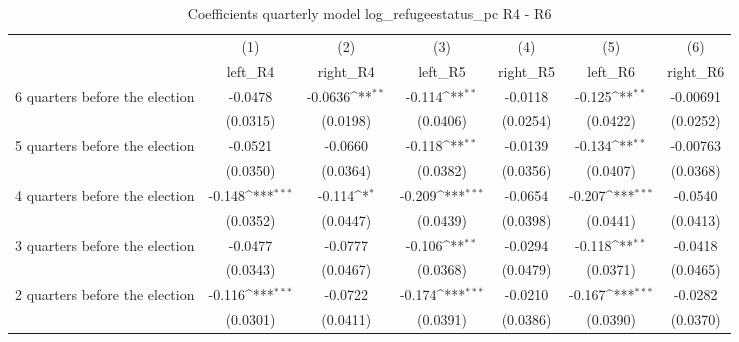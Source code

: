 \begin{table}[htbp]\centering
\def\sym#1{\ifmmode^{#1}\else\(^{#1}\)\fi}
\caption{Coefficients quarterly model log\_refugeestatus\_pc R4 - R6}
\begin{tabular}{l*{6}{c}}
\hline\hline
                    &\multicolumn{1}{c}{(1)}&\multicolumn{1}{c}{(2)}&\multicolumn{1}{c}{(3)}&\multicolumn{1}{c}{(4)}&\multicolumn{1}{c}{(5)}&\multicolumn{1}{c}{(6)}\\
                    &\multicolumn{1}{c}{left\_R4}&\multicolumn{1}{c}{right\_R4}&\multicolumn{1}{c}{left\_R5}&\multicolumn{1}{c}{right\_R5}&\multicolumn{1}{c}{left\_R6}&\multicolumn{1}{c}{right\_R6}\\
\hline
 6 quarters before the election&     -0.0478         &     -0.0636\sym{**} &      -0.114\sym{**} &     -0.0118         &      -0.125\sym{**} &    -0.00691         \\
                    &    (0.0315)         &    (0.0198)         &    (0.0406)         &    (0.0254)         &    (0.0422)         &    (0.0252)         \\
[1em]
 5 quarters before the election&     -0.0521         &     -0.0660         &      -0.118\sym{**} &     -0.0139         &      -0.134\sym{**} &    -0.00763         \\
                    &    (0.0350)         &    (0.0364)         &    (0.0382)         &    (0.0356)         &    (0.0407)         &    (0.0368)         \\
[1em]
 4 quarters before the election&      -0.148\sym{***}&      -0.114\sym{*}  &      -0.209\sym{***}&     -0.0654         &      -0.207\sym{***}&     -0.0540         \\
                    &    (0.0352)         &    (0.0447)         &    (0.0439)         &    (0.0398)         &    (0.0441)         &    (0.0413)         \\
[1em]
 3 quarters before the election&     -0.0477         &     -0.0777         &      -0.106\sym{**} &     -0.0294         &      -0.118\sym{**} &     -0.0418         \\
                    &    (0.0343)         &    (0.0467)         &    (0.0368)         &    (0.0479)         &    (0.0371)         &    (0.0465)         \\
[1em]
 2 quarters before the election&      -0.116\sym{***}&     -0.0722         &      -0.174\sym{***}&     -0.0210         &      -0.167\sym{***}&     -0.0282         \\
                    &    (0.0301)         &    (0.0411)         &    (0.0391)         &    (0.0386)         &    (0.0390)         &    (0.0370)         \\

\end{tabular}
\end{table}
